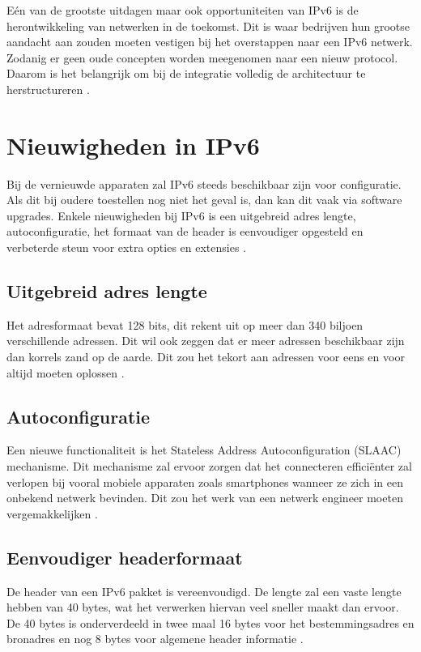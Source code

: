 Eén van de grootste uitdagen maar ook opportuniteiten van IPv6 is de herontwikkeling van netwerken in de toekomst. Dit is waar bedrijven hun grootse aandacht aan zouden moeten vestigen bij het overstappen naar een IPv6 netwerk. Zodanig er geen oude concepten worden meegenomen naar een nieuw protocol. Daarom is het belangrijk om bij de integratie volledig de architectuur te herstructureren \autocite{Hagen2014}. 

\section{Nieuwigheden in IPv6}

Bij de vernieuwde apparaten zal IPv6 steeds beschikbaar zijn voor configuratie. Als dit bij oudere toestellen nog niet het geval is, dan kan dit vaak via software upgrades. Enkele nieuwigheden bij IPv6 is een uitgebreid adres lengte, autoconfiguratie, het formaat van de header is eenvoudiger opgesteld en verbeterde steun voor extra opties en extensies \autocite{Hagen2014}.

\subsection{Uitgebreid adres lengte}

Het adresformaat bevat 128 bits, dit rekent uit op meer dan 340 biljoen verschillende adressen. Dit wil ook zeggen dat er meer adressen beschikbaar zijn dan korrels zand op de aarde. Dit zou het tekort aan adressen voor eens en voor altijd moeten oplossen \autocite{Hagen2014}.

\subsection{Autoconfiguratie}

Een nieuwe functionaliteit is het Stateless Address Autoconfiguration (SLAAC) mechanisme. Dit mechanisme zal ervoor zorgen dat het connecteren efficiënter zal verlopen bij vooral mobiele apparaten zoals smartphones wanneer ze zich in een onbekend netwerk bevinden. Dit zou het werk van een netwerk engineer moeten vergemakkelijken \autocite{Hagen2014}. 

\subsection{Eenvoudiger headerformaat}

De header van een IPv6 pakket is vereenvoudigd. De lengte zal een vaste lengte hebben van 40 bytes, wat het verwerken hiervan veel sneller maakt dan ervoor. De 40 bytes is onderverdeeld in twee maal 16 bytes voor het bestemmingsadres en bronadres en nog 8 bytes voor algemene header informatie \autocite{Hagen2014}.

